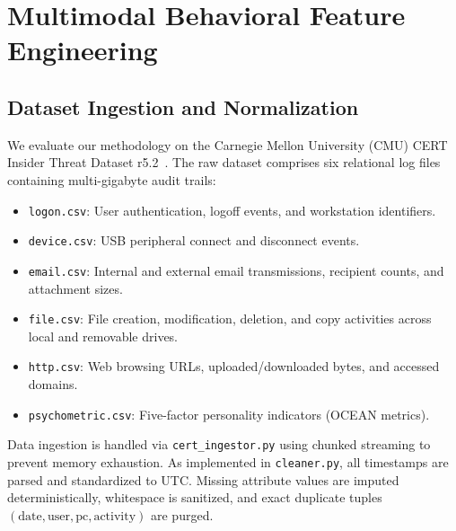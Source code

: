 \documentclass[conference]{IEEEtran}
\begin{document}
\section{Multimodal Behavioral Feature Engineering}
\label{sec:pipeline}

\subsection{Dataset Ingestion and Normalization}
We evaluate our methodology on the Carnegie Mellon University (CMU) CERT Insider Threat Dataset r5.2~\cite{glasser2013cert}. The raw dataset comprises six relational log files containing multi-gigabyte audit trails:
\begin{itemize}
    \item \texttt{logon.csv}: User authentication, logoff events, and workstation identifiers.
    \item \texttt{device.csv}: USB peripheral connect and disconnect events.
    \item \texttt{email.csv}: Internal and external email transmissions, recipient counts, and attachment sizes.
    \item \texttt{file.csv}: File creation, modification, deletion, and copy activities across local and removable drives.
    \item \texttt{http.csv}: Web browsing URLs, uploaded/downloaded bytes, and accessed domains.
    \item \texttt{psychometric.csv}: Five-factor personality indicators (OCEAN metrics).
\end{itemize}

Data ingestion is handled via \texttt{cert\_ingestor.py} using chunked streaming to prevent memory exhaustion. As implemented in \texttt{cleaner.py}, all timestamps are parsed and standardized to UTC. Missing attribute values are imputed deterministically, whitespace is sanitized, and exact duplicate tuples $(\text{date}, \text{user}, \text{pc}, \text{activity})$ are purged.
\end{document}
